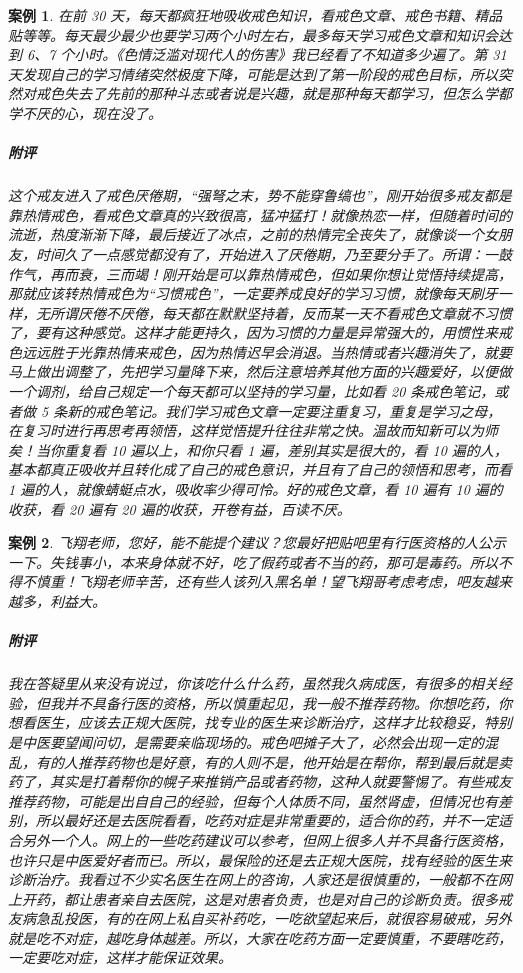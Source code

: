 \documentclass{ctexart}
\newtheorem{case}{案例}
\begin{document}
\begin{case}
    在前 30 天，每天都疯狂地吸收戒色知识，看戒色文章、戒色书籍、精品贴等等。每天最少最少也要学习两个小时左右，最多每天学习戒色文章和知识会达到 6、7 个小时。《色情泛滥对现代人的伤害》我已经看了不知道多少遍了。第 31 天发现自己的学习情绪突然极度下降，可能是达到了第一阶段的戒色目标，所以突然对戒色失去了先前的那种斗志或者说是兴趣，就是那种每天都学习，但怎么学都学不厌的心，现在没了。
    \subparagraph{附评} 这个戒友进入了戒色厌倦期，“强弩之末，势不能穿鲁缟也”，刚开始很多戒友都是靠热情戒色，看戒色文章真的兴致很高，猛冲猛打！就像热恋一样，但随着时间的流逝，热度渐渐下降，最后接近了冰点，之前的热情完全丧失了，就像谈一个女朋友，时间久了一点感觉都没有了，开始进入了厌倦期，乃至要分手了。所谓：一鼓作气，再而衰，三而竭！刚开始是可以靠热情戒色，但如果你想让觉悟持续提高，那就应该转热情戒色为“习惯戒色”，一定要养成良好的学习习惯，就像每天刷牙一样，无所谓厌倦不厌倦，每天都在默默坚持着，反而某一天不看戒色文章就不习惯了，要有这种感觉。这样才能更持久，因为习惯的力量是异常强大的，用惯性来戒色远远胜于光靠热情来戒色，因为热情迟早会消退。当热情或者兴趣消失了，就要马上做出调整了，先把学习量降下来，然后注意培养其他方面的兴趣爱好，以便做一个调剂，给自己规定一个每天都可以坚持的学习量，比如看 20 条戒色笔记，或者做 5 条新的戒色笔记。我们学习戒色文章一定要注重复习，重复是学习之母，在复习时进行再思考再领悟，这样觉悟提升往往非常之快。温故而知新可以为师矣！当你重复看 10 遍以上，和你只看 1 遍，差别其实是很大的，看 10 遍的人，基本都真正吸收并且转化成了自己的戒色意识，并且有了自己的领悟和思考，而看 1 遍的人，就像蜻蜓点水，吸收率少得可怜。好的戒色文章，看 10 遍有 10 遍的收获，看 20 遍有 20 遍的收获，开卷有益，百读不厌。
\end{case}

\begin{case}
    飞翔老师，您好，能不能提个建议？您最好把贴吧里有行医资格的人公示一下。失钱事小，本来身体就不好，吃了假药或者不当的药，那可是毒药。所以不得不慎重！飞翔老师辛苦，还有些人该列入黑名单！望飞翔哥考虑考虑，吧友越来越多，利益大。
    \subparagraph{附评} 我在答疑里从来没有说过，你该吃什么什么药，虽然我久病成医，有很多的相关经验，但我并不具备行医的资格，所以慎重起见，我一般不推荐药物。你想吃药，你想看医生，应该去正规大医院，找专业的医生来诊断治疗，这样才比较稳妥，特别是中医要望闻问切，是需要亲临现场的。戒色吧摊子大了，必然会出现一定的混乱，有的人推荐药物也是好意，有的人则不是，他开始是在帮你，帮到最后就是卖药了，其实是打着帮你的幌子来推销产品或者药物，这种人就要警惕了。有些戒友推荐药物，可能是出自自己的经验，但每个人体质不同，虽然肾虚，但情况也有差别，所以最好还是去医院看看，吃药对症是非常重要的，适合你的药，并不一定适合另外一个人。网上的一些吃药建议可以参考，但网上很多人并不具备行医资格，也许只是中医爱好者而已。所以，最保险的还是去正规大医院，找有经验的医生来诊断治疗。我看过不少实名医生在网上的咨询，人家还是很慎重的，一般都不在网上开药，都让患者亲自去医院，这是对患者负责，也是对自己的诊断负责。很多戒友病急乱投医，有的在网上私自买补药吃，一吃欲望起来后，就很容易破戒，另外就是吃不对症，越吃身体越差。所以，大家在吃药方面一定要慎重，不要瞎吃药，一定要吃对症，这样才能保证效果。
\end{case}
\end{document}
